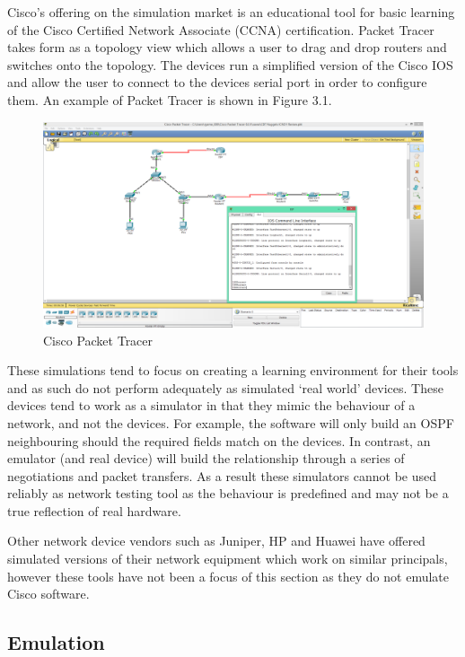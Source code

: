 \documentclass[11pt]{report}
\begin{document}
Cisco's offering on the simulation market is an educational tool for basic learning of the Cisco Certified Network Associate (CCNA) certification. Packet Tracer \citep{ciscoPacketTracer} takes form as a topology view which allows a user to drag and drop routers and switches onto the topology. The devices run a simplified version of the Cisco IOS and allow the user to connect to the devices serial port in order to configure them. An example of Packet Tracer is shown in Figure 3.1.

\begin{figure}[h!]
	\caption{Cisco Packet Tracer}
	\centering
	\includegraphics[width=1\textwidth]{packetTracer.png}
\end{figure}

 These simulations tend to focus on creating a learning environment for their tools and as such do not perform adequately as simulated `real world' devices. These devices tend to work as a simulator in that they mimic the behaviour of a network, and not the devices. For example, the software will only build an OSPF neighbouring should the required fields match on the devices. In contrast, an emulator (and real device) will build the relationship through a series of negotiations and packet transfers. As a result these simulators cannot be used reliably as network testing tool as the behaviour is predefined and may not be a true reflection of real hardware.
 
 Other network device vendors such as Juniper, HP and Huawei have offered simulated versions of their network equipment which work on similar principals, however these tools have not been a focus of this section as they do not emulate Cisco software.

\subsection{Emulation}
\end{document}
